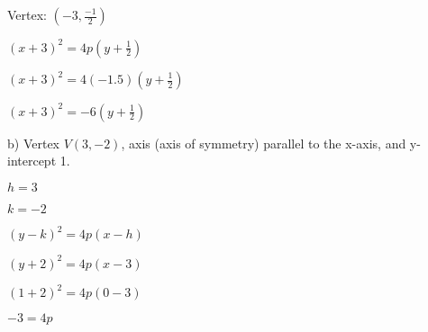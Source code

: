 \documentclass{report}
\begin{document}
\begin{center}
Vertex: $(-3,\frac{-1}{2})$
\vspace{2mm}

$(x+3)^2 = 4p(y+\frac{1}{2})$
\vspace{2mm}

$(x+3)^2=4(-1.5)\left(y+\frac{1}{2}\right)$
\vspace{2mm}

$(x+3)^2=-6\left(y+\frac{1}{2}\right)$
\end{center}
\bigbreak \noindent \bigbreak \noindent
\begin{large}
b) Vertex $V(3,-2)$, axis (axis of symmetry) parallel  to the x-axis, and y-intercept 1.
\vspace{2mm}


\end{large}
\bigbreak \noindent
\begin{center}
 $h = 3$ 
 \vspace{2mm}

 $k =-2$ 
 \vspace{2mm}
 
$(y-k)^2=4 p(x-h)$
\vspace{2mm}

$(y+2)^2=4 p(x-3)$
\vspace{2mm}

$(1+2)^2=4 p(0-3)$
\vspace{2mm}

$-3 = 4p$
\vspace{2mm}

\end{center}
\end{document}
